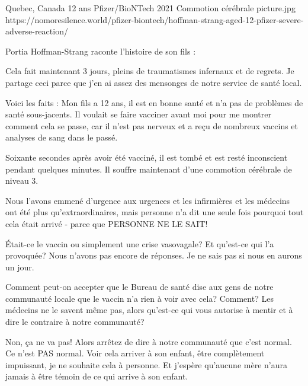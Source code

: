 {Quebec, Canada}
{12 ans}
{Pfizer/BioNTech}
{2021}
{Commotion cérébrale}
{picture.jpg}
{https://nomoresilence.world/pfizer-biontech/hoffman-strang-aged-12-pfizer-severe-adverse-reaction/}
{

Portia Hoffman-Strang raconte l'histoire de son fils :

Cela fait maintenant 3 jours, pleins de traumatismes infernaux et de regrets. Je
partage ceci parce que j'en ai assez des mensonges de notre service de santé
local.

Voici les faits : Mon fils a 12 ans, il est en bonne santé et n'a pas de
problèmes de santé sous-jacents. Il voulait se faire vacciner avant moi pour me
montrer comment cela se passe, car il n'est pas nerveux et a reçu de nombreux
vaccins et analyses de sang dans le passé.

Soixante secondes après avoir été vacciné, il est tombé et est resté inconscient
pendant quelques minutes. Il souffre maintenant d'une commotion cérébrale de
niveau 3.

Nous l'avons emmené d'urgence aux urgences et les infirmières et les médecins
ont été plus qu'extraordinaires, mais personne n'a dit une seule fois pourquoi
tout cela était arrivé - parce que PERSONNE NE LE SAIT!

Était-ce le vaccin ou simplement une crise vasovagale? Et qu'est-ce qui l'a
provoquée? Nous n'avons pas encore de réponses. Je ne sais pas si nous en aurons
un jour.

Comment peut-on accepter que le Bureau de santé dise aux gens de notre
communauté locale que le vaccin n'a rien à voir avec cela? Comment? Les médecins
ne le savent même pas, alors qu'est-ce qui vous autorise à mentir et à dire le
contraire à notre communauté?

Non, ça ne va pas! Alors arrêtez de dire à notre communauté que c'est normal. Ce
n'est PAS normal. Voir cela arriver à son enfant, être complètement impuissant,
je ne souhaite cela à personne. Et j'espère qu'aucune mère n'aura jamais à être
témoin de ce qui arrive à son enfant.

}
